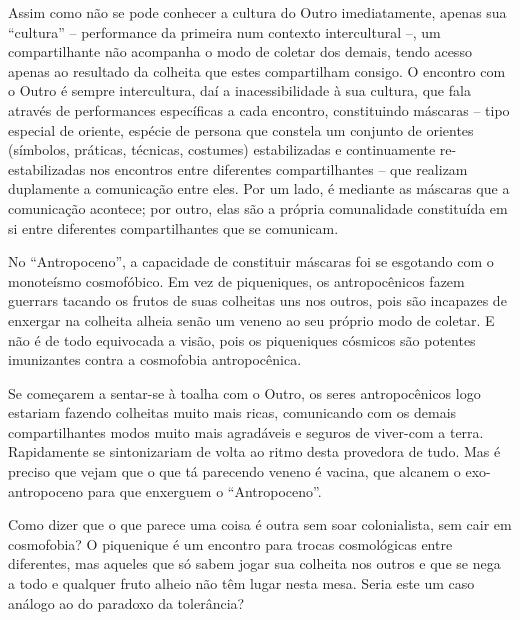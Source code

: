 Assim como não se pode conhecer a cultura do Outro imediatamente, apenas sua \enquote{cultura} -- performance da primeira num contexto intercultural --, um compartilhante não acompanha o modo de coletar dos demais, tendo acesso apenas ao resultado da colheita que estes compartilham consigo. O encontro com o Outro é sempre intercultura, daí a inacessibilidade à sua cultura, que fala através de performances específicas a cada encontro, constituindo máscaras -- tipo especial de oriente, espécie de persona que constela um conjunto de orientes (símbolos, práticas, técnicas, costumes) estabilizadas e continuamente re-estabilizadas nos encontros entre diferentes compartilhantes -- que realizam duplamente a comunicação entre eles. Por um lado, é mediante as máscaras que a comunicação acontece; por outro, elas são a própria comunalidade constituída em si entre diferentes compartilhantes que se comunicam.

No \enquote{Antropoceno}, a capacidade de constituir máscaras foi se esgotando com o monoteísmo cosmofóbico. Em vez de piqueniques, os antropocênicos fazem guerrars tacando os frutos de suas colheitas uns nos outros, pois são incapazes de enxergar na colheita alheia senão um veneno ao seu próprio modo de coletar. E não é de todo equivocada a visão, pois os piqueniques cósmicos são potentes imunizantes contra a cosmofobia antropocênica.

Se começarem a sentar-se à toalha com o Outro, os seres antropocênicos logo estariam fazendo colheitas muito mais ricas, comunicando com os demais compartilhantes modos muito mais agradáveis e seguros de viver-com a terra. Rapidamente se sintonizariam de volta ao ritmo desta provedora de tudo. Mas é preciso que vejam que o que tá parecendo veneno é vacina, que alcanem o exo-antropoceno para que enxerguem o \enquote{Antropoceno}.


Como dizer que o que parece uma coisa é outra sem soar colonialista, sem cair em cosmofobia? O piquenique é um encontro para trocas cosmológicas entre diferentes, mas aqueles que só sabem jogar sua colheita nos outros e que se nega a todo e qualquer fruto alheio não têm lugar nesta mesa. Seria este um caso análogo ao do paradoxo da tolerância?

